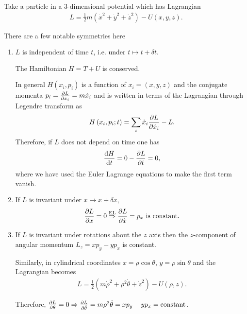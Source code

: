 \begin{example}
    Take a particle in a 3-dimensional potential which has Lagrangian
    \begin{align}
        L = \frac{1}{2}m \left( \dot{x}^2 + \dot{y}^2 + \dot{z}^2 \right) - U \left( x,y,z \right) 
    .\end{align}

    There are a few notable symmetries here
    \begin{enumerate}
        \item $L$ is independent of time $t$, i.e. under $t \mapsto t + \delta t$.
            \begin{claim}
                The Hamiltonian $H = T + U$ is conserved.
            \end{claim}

            In general $H\left( x_{i}, p_{i} \right) $ is a function of $x_{i} = (x,y,z)$ and the conjugate momenta $p_{i} = \pdv{L}{\dot{x}_{i}} = m \dot{x}_{i}$ and is written in terms of the Lagrangian through Legendre transform as
            \begin{align}
                H \left( x_{i}, p_{i}; t \right) = \sum_{i}^{} \dot{x}_{i} \pdv{L}{\dot{x}_{i}} - L
            .\end{align}
            Therefore, if $L$ does not depend on time one has
            \begin{align}
                \dv{H}{t} = 0 - \pdv{L}{t}  = 0
            ,\end{align}
            where we have used the Euler Lagrange equations to make the first term vanish.

        \item If $L$ is invariant under $x \mapsto x + \delta x$,
            \begin{align}
                \pdv{L}{x} = 0 \overset{\text{EL}}{\Rightarrow} \pdv{L}{\dot{x}} = p_x \text{~is constant}
            .\end{align}
        \item If $L$ is invariant under rotations about the $z$ axis then the $z$-component of angular momentum $L_z = x p_y - y p_x$ is constant. 

            Similarly, in cylindrical coordinates $x = \rho \cos \theta$, $y = \rho \sin \theta$ and the Lagrangian becomes
            \begin{align}
                L = \frac{1}{2} \left( m \dot{\rho}^2 + \rho^2 \dot{\theta} + \dot{z}^2 \right) - U \left( \rho, z \right) 
            .\end{align}

            Therefore, $\pdv{L}{\theta} = 0 \Rightarrow \pdv{L}{\dot{\theta}} = m \rho^2 \dot{\theta} = x p_y - y p_x = \text{constant}$.
    \end{enumerate}
\end{example}


